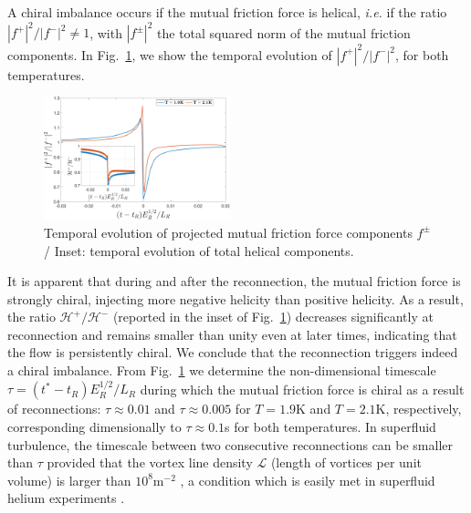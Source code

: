 \documentclass[%
 reprint,
 amsmath,amssymb,
 aps,
 prl,
]{revtex4-2}
\begin{document}
{A chiral imbalance occurs if the mutual friction force is helical, 
\textit{i.e.} if the ratio $|f^+|^2/|f^-|^2 \neq 1$, with $|f^\pm|^2$ the total squared norm of the mutual friction components. 
In Fig.~\ref{fig:mutual-friction-decomp}, we show the temporal evolution of $|f^+|^2/|f^-|^2$, for both temperatures. 
%
\begin{figure}[h!]
    \centering
    \includegraphics*[width=0.48\textwidth]{fmfDecompFig.pdf}
    \caption{Temporal evolution of projected mutual friction force components $f^\pm$/ Inset: temporal evolution of total helical components.}
    \label{fig:mutual-friction-decomp}
\end{figure}
%
It is apparent
that during and after the reconnection, the mutual friction force is strongly chiral,
injecting more negative helicity than positive helicity. 
As a result, the ratio $\mathcal{H}^+/\mathcal{H}^-$ 
(reported in the inset of Fig.~\ref{fig:mutual-friction-decomp}) 
decreases significantly at reconnection and remains smaller than unity even at later times, 
indicating that the flow is persistently chiral. We conclude that the reconnection triggers indeed a chiral imbalance.
From Fig.~\ref{fig:mutual-friction-decomp} we determine the non-dimensional timescale $\tau = (t^*-t_R)E_R^{1/2}/L_R$
during which the mutual friction force is chiral as a result of reconnections: $\tau \approx 0.01$ and $\tau \approx 0.005$
for $T=1.9$K and $T=2.1$K, respectively, corresponding dimensionally to $\tau \approx 0.1$s for both temperatures. 
In superfluid turbulence, the timescale between two consecutive reconnections can be smaller than $\tau$ provided that the
vortex line density $\mathcal{L}$ (length of vortices per unit volume) is larger than $10^8 \text{m}^{-2}$ \cite{stasiak2024quantum,barenghi2004},
a condition which is easily met in superfluid helium experiments \cite{roche2007,Babuin2014}.




}
\end{document}
